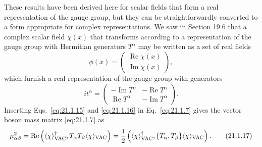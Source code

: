 These results have been derived here for scalar fields that form a real
representation of the gauge group, but they can be straightforwardly
converted to a form appropriate for complex representations. We saw in
Section 19.6 that a complex scalar field $\chi(x)$ that transforms according
to a representation of the gauge group with Hermitian generators $T^\alpha$
may be written as a set of real fields
\begin{equation}
 \phi(x)=
 \begin{pmatrix}
  \operatorname{Re}\chi(x)\\
  \operatorname{Im}\chi(x)
 \end{pmatrix},
 \tag{21.1.15}\label{eq:21.1.15}
\end{equation}
which furnish a real representation of the gauge group with generators
\begin{equation}
 it^\alpha=
 \begin{pmatrix}
  -\operatorname{Im}T^\alpha&-\operatorname{Re}T^\alpha\\
  \operatorname{Re}T^\alpha&-\operatorname{Im}T^\alpha
 \end{pmatrix}.
 \tag{21.1.16}\label{eq:21.1.16}
\end{equation}
Inserting Eqs.~\eqref{eq:21.1.15} and \eqref{eq:21.1.16} in
Eq.~\eqref{eq:21.1.7} gives the vector boson mass matrix
\eqref{eq:21.1.7} as
\begin{equation}
 \mu^2_{\alpha\beta}
 =\operatorname{Re}\left(
 \langle\chi\rangle_{\rm VAC}^\dagger,
 T_\alpha T_\beta\langle\chi\rangle_{\rm VAC}\right)
 =\frac12\left(
 \langle\chi\rangle_{\rm VAC}^\dagger,
 \{T_\alpha,T_\beta\}\langle\chi\rangle_{\rm VAC}\right).
 \tag{21.1.17}\label{eq:21.1.17}
\end{equation}

